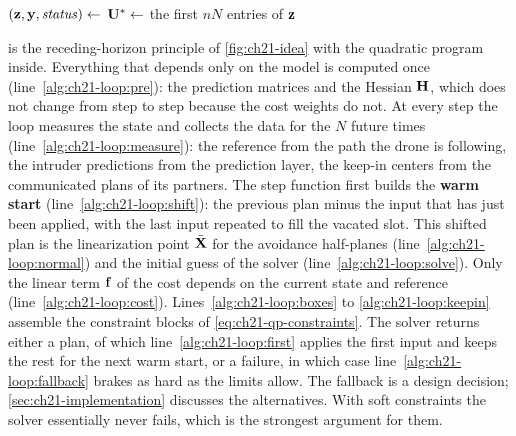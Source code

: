\begin{algorithm}[htb]
{{  }
  $(\mathbf{z},\mathbf{y},\mathit{status})\gets$ \label{alg:ch21-loop:solve}\;
  $\mathbf{U}^{*}\gets$ the first $nN$ entries of $\mathbf{z}$\;
  \label{alg:ch21-loop:first}\;
}
\end{algorithm}

 is the receding-horizon principle of
\cref{fig:ch21-idea} with the quadratic program inside. Everything that
depends only on the model is computed once
(line~\ref{alg:ch21-loop:pre}): the prediction matrices and the Hessian
$\mathbf{H}$, which does not change from step to step because the cost weights do
not. At every step the loop measures the state and collects the data for the
$N$ future times (line~\ref{alg:ch21-loop:measure}): the reference from the
path the drone is following, the intruder predictions from the prediction
layer, the keep-in centers from the communicated plans of its partners. The
step function first builds the \textbf{warm start}
(line~\ref{alg:ch21-loop:shift}): the previous plan minus the input that has
just been applied, with the last input repeated to fill the vacated slot. This
shifted plan is the linearization point $\bar{\mathbf{X}}$ for the avoidance
half-planes (line~\ref{alg:ch21-loop:normal}) and the initial guess of the
solver (line~\ref{alg:ch21-loop:solve}). Only the linear term $\mathbf{f}$ of
the cost depends on the current state and reference
(line~\ref{alg:ch21-loop:cost}). Lines~\ref{alg:ch21-loop:boxes} to
\ref{alg:ch21-loop:keepin} assemble the constraint blocks of
\cref{eq:ch21-qp-constraints}. The solver returns either a plan, of which
line~\ref{alg:ch21-loop:first} applies the first input and keeps the rest for
the next warm start, or a failure, in which case
line~\ref{alg:ch21-loop:fallback} brakes as hard as the limits allow. The
fallback is a design decision; \cref{sec:ch21-implementation} discusses the
alternatives. With soft constraints the solver essentially never fails, which
is the strongest argument for them.

